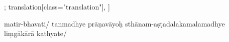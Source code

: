 \documentclass[12pt]{article}%
\def\om{\textrm{\foreignlanguage{english}{\footnotesize omitted in\ }}} %
\begin{document}
\begin{alignment}[
    texts=edition[class="edition"];
    translation[class="translation"],
  ]
\begin{edition}
\begin{prose}
{        
        matir-bhavati/}
tanmadhye prāṇavāyoḥ sthānam-aṣṭadalakamalamadhye liṃgākārā  kathyate/   

\end{prose}
\end{edition}
\end{alignment}
\end{document}
